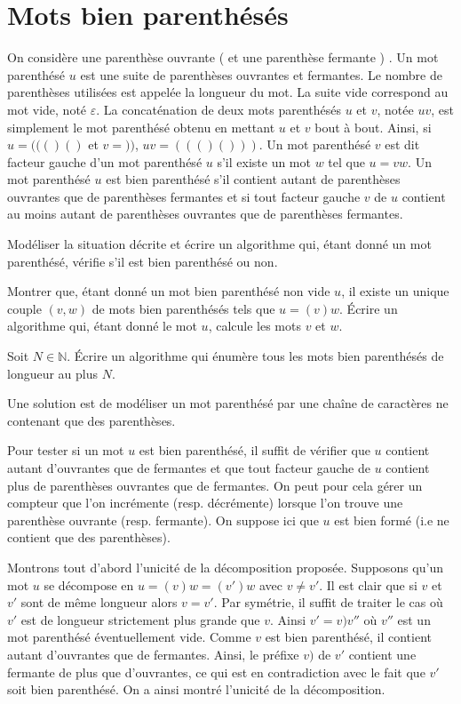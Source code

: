 \renewcommand{\SourceFile}{2-jouer-avec-les-mots/src/2-5.ml}

\section{Mots bien parenthésés}

On considère une parenthèse ouvrante \og ( \fg{} et une parenthèse fermante \og ) \fg{}. Un mot parenthésé $u$ est une suite de parenthèses ouvrantes et fermantes. Le nombre de parenthèses utilisées est appelée la longueur du mot. La suite vide correspond au mot vide, noté $\varepsilon$. La concaténation de deux mots parenthésés $u$ et $v$, notée $uv$, est simplement le mot parenthésé obtenu en mettant $u$ et $v$ bout à bout. Ainsi, si $u=((()()$ et $v=))$, $uv=((()()))$. Un mot parenthésé $v$ est dit facteur gauche d'un mot parenthésé $u$ s'il existe un mot $w$ tel que $u=vw$. Un mot parenthésé $u$ est bien parenthésé s'il contient autant de parenthèses ouvrantes que de parenthèses fermantes et si tout facteur gauche $v$ de $u$ contient au moins autant de parenthèses ouvrantes que de parenthèses fermantes.

\Q
Modéliser la situation décrite et écrire un algorithme qui, étant donné un mot parenthésé, vérifie s'il est bien parenthésé ou non.

\Q
Montrer que, étant donné un mot bien parenthésé non vide $u$, il existe un unique couple $(v, w)$ de mots bien parenthésés tels que $u=(v)w$. Écrire un algorithme qui, étant donné le mot $u$, calcule les mots $v$ et $w$.

\Q
Soit $N\in\mathbb{N}$. Écrire un algorithme qui énumère tous les mots bien parenthésés de longueur au plus $N$.

\Corrige

\Q
Une solution est de modéliser un mot parenthésé par une chaîne de caractères ne contenant que des parenthèses.
\smallskip

Pour tester si un mot $u$ est bien parenthésé, il suffit de vérifier que $u$ contient autant d'ouvrantes que de fermantes et que tout facteur gauche de $u$ contient plus de parenthèses ouvrantes que de fermantes. On peut pour cela gérer un compteur que l'on incrémente (resp. décrémente) lorsque l'on trouve une parenthèse ouvrante (resp. fermante). On suppose ici que $u$ est bien formé (i.e ne contient que des parenthèses).



\Q
Montrons tout d'abord l'unicité de la décomposition proposée. Supposons qu'un mot $u$ se décompose en $u=(v)w=(v')w$ avec $v \neq v'$. Il est clair que si $v$ et $v'$ sont de même longueur alors $v=v'$. Par symétrie, il suffit de traiter le cas où $v'$ est de longueur strictement plus grande que $v$. Ainsi $v'=v)v''$ où $v''$ est un mot parenthésé éventuellement vide. Comme $v$ est bien parenthésé, il contient autant d'ouvrantes que de fermantes. Ainsi, le préfixe $v)$ de $v'$ contient une fermante de plus que d'ouvrantes, ce qui est en contradiction avec le fait que $v'$ soit bien parenthésé. On a ainsi montré l'unicité de la décomposition.
\medskip

